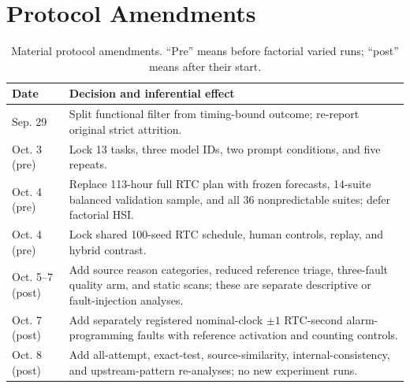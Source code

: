 \appendix
\section{Protocol Amendments}\label{app:amend}
\begin{table}[t]
\caption{Material protocol amendments. ``Pre'' means before factorial varied runs; ``post'' means after their start.}
\label{tab:amend}
\small
\begin{tabular}{@{}p{}p{}@{}}
\toprule
Date & Decision and inferential effect \\
\midrule
Sep. 29 & Split functional filter from timing-bound outcome; re-report original strict attrition. \\
Oct. 3 (pre) & Lock 13 tasks, three model IDs, two prompt conditions, and five repeats. \\
Oct. 4 (pre) & Replace 113-hour full RTC plan with frozen forecasts, 14-suite balanced validation sample, and all 36 nonpredictable suites; defer factorial HSI. \\
Oct. 4 (pre) & Lock shared 100-seed RTC schedule, human controls, replay, and hybrid contrast. \\
Oct. 5--7 (post) & Add source reason categories, reduced reference triage, three-fault quality arm, and static scans; these are separate descriptive or fault-injection analyses. \\
Oct. 7 (post) & Add separately registered nominal-clock $\pm1$ RTC-second alarm-programming faults with reference activation and counting controls. \\
Oct. 8 (post) & Add all-attempt, exact-test, source-similarity, internal-consistency, and upstream-pattern re-analyses; no new experiment runs. \\
\bottomrule
\end{tabular}
\end{table}

